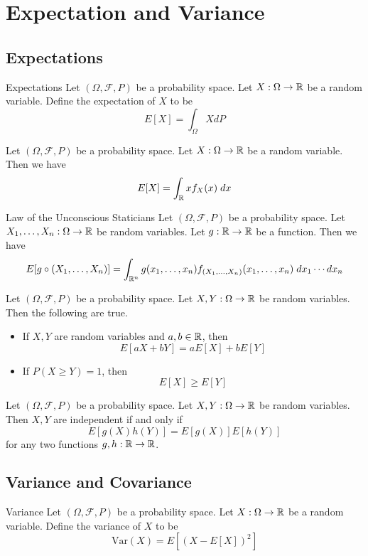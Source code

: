 \documentclass[a4paper]{article}
\begin{document}
\pagebreak
\section{Expectation and Variance}
\subsection{Expectations}
\begin{defn}{Expectations}{} Let $(\Omega,\mathcal{F},P)$ be a probability space. Let $X:\Omega\to\mathbb{R}$ be a random variable. Define the expectation of $X$ to be $$E[X]=\int_\Omega XdP$$
\end{defn}

\begin{lmm}{}{} Let $(\Omega,\mathcal{F},P)$ be a probability space. Let $X:\Omega\to\mathbb{R}$ be a random variable. Then we have $$E[X]=\int_{\mathbb{R}} xf_X(x)\;dx$$
\end{lmm}

\begin{prp}{Law of the Unconscious Staticians}{} Let $(\Omega,\mathcal{F},P)$ be a probability space. Let $X_1,\dots,X_n:\Omega\to\mathbb{R}$ be random variables. Let $g:\mathbb{R}\to\mathbb{R}$ be a function. Then we have $$E[g\circ(X_1,\dots,X_n)]=\int_{\mathbb{R}^n}g(x_1,\dots,x_n)f_{(X_1,\dots,X_n)}(x_1,\dots,x_n)\;dx_1\cdots dx_n$$
\end{prp}

\begin{prp}{}{} Let $(\Omega,\mathcal{F},P)$ be a probability space. Let $X,Y:\Omega\to\mathbb{R}$ be random variables. Then the following are true. 
\begin{itemize}
\item If $X,Y$ are random variables and $a,b\in\mathbb{R}$, then $$E[aX+bY]=aE[X]+bE[Y]$$
\item If $P(X\geq Y)=1$, then $$E[X]\geq E[Y]$$
\end{itemize}
\end{prp}

\begin{prp}{}{} Let $(\Omega,\mathcal{F},P)$ be a probability space. Let $X,Y:\Omega\to\mathbb{R}$ be random variables. Then $X,Y$ are independent if and only if $$E[g(X)h(Y)]=E[g(X)]E[h(Y)]$$ for any two functions $g,h:\mathbb{R}\to\mathbb{R}$. 
\end{prp}

\subsection{Variance and Covariance}
\begin{defn}{Variance}{} Let $(\Omega,\mathcal{F},P)$ be a probability space. Let $X:\Omega\to\mathbb{R}$ be a random variable. Define the variance of $X$ to be $$\text{Var}(X)=E[(X-E[X])^2]$$
\end{defn}
\end{document}
